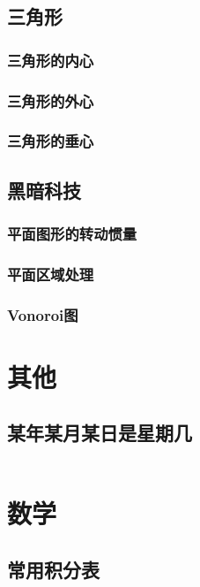 \documentclass[a4paper]{article}
\newcommand{\cppcode}[1]{
    \inputminted[mathescape]{cpp}{source/#1}
}
\begin{document}
\subsection{三角形}

\subsubsection{三角形的内心}

\subsubsection{三角形的外心}

\subsubsection{三角形的垂心}

\subsection{黑暗科技}

\subsubsection{平面图形的转动惯量}

\subsubsection{平面区域处理}

\subsubsection{Vonoroi图}

\section{其他}

\subsection{某年某月某日是星期几}

\cppcode{miscellany/what-day-is-today.cpp}

\section{数学}

\subsection{常用积分表}
\end{document}

